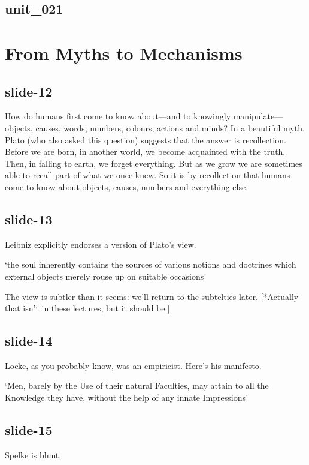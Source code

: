 \documentclass[12pt,\papersize]{extarticle}
\begin{document}
\subsection{unit\_021}


\section{From Myths to Mechanisms}

\subsection{slide-12}
How do humans first come to know  about---and to knowingly manipulate---objects, causes, words,
numbers, colours, actions and minds?
In a beautiful myth, Plato (who also asked this question) suggests that the answer is
recollection.
Before we are born, in another world, we become acquainted with the truth.
Then, in falling to earth, we forget everything.
But as we grow we are sometimes able to recall part of what we once knew.
So it is by recollection that humans come to know about objects, causes, numbers and everything
else.

\subsection{slide-13}
Leibniz explicitly endorses a version of Plato's view.

‘the soul inherently contains the sources of various notions and doctrines which external objects merely rouse up on suitable occasions’
\citep[p.\ 48]{Leibniz:1996bl}

The view is subtler than it seems: we'll return to the subtelties later.
[*Actually that isn't in these lectures, but it should be.]

\subsection{slide-14}
Locke, as you probably know, was an empiricist.  Here's his manifesto.

‘Men, barely by the Use of their natural Faculties, may attain to all the Knowledge
they have, without the help of any innate Impressions’
\citep[p.\ 48]{Locke:1975qo}

\subsection{slide-15}
Spelke is blunt.
\end{document}
